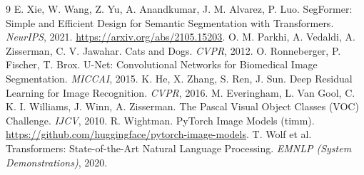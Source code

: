 \documentclass[12pt]{article}
\begin{document}
\begin{thebibliography}{9}
 E. Xie, W. Wang, Z. Yu, A. Anandkumar, J. M. Alvarez, P. Luo. SegFormer: Simple and Efficient Design for Semantic Segmentation with Transformers. \emph{NeurIPS}, 2021. \url{https://arxiv.org/abs/2105.15203}.
 O. M. Parkhi, A. Vedaldi, A. Zisserman, C. V. Jawahar. Cats and Dogs. \emph{CVPR}, 2012.
 O. Ronneberger, P. Fischer, T. Brox. U-Net: Convolutional Networks for Biomedical Image Segmentation. \emph{MICCAI}, 2015.
 K. He, X. Zhang, S. Ren, J. Sun. Deep Residual Learning for Image Recognition. \emph{CVPR}, 2016.
 M. Everingham, L. Van Gool, C. K. I. Williams, J. Winn, A. Zisserman. The Pascal Visual Object Classes (VOC) Challenge. \emph{IJCV}, 2010.
 R. Wightman. PyTorch Image Models (timm). \url{https://github.com/huggingface/pytorch-image-models}.
 T. Wolf et al. Transformers: State-of-the-Art Natural Language Processing. \emph{EMNLP (System Demonstrations)}, 2020.
\end{thebibliography}
\end{document}
